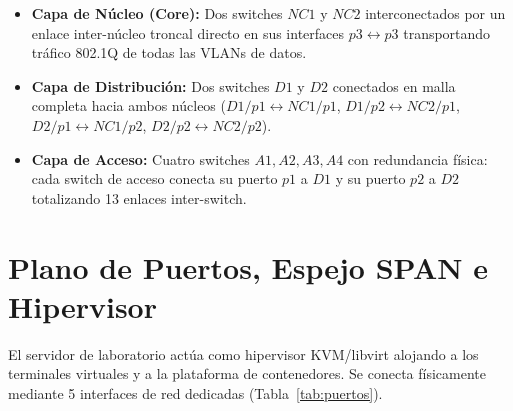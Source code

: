 \documentclass[11pt,a4paper]{report}
\begin{document}
\begin{itemize}[leftmargin=*]
    \item \textbf{Capa de Núcleo (Core):} Dos switches $NC1$ y $NC2$ interconectados por un enlace inter-núcleo troncal directo en sus interfaces $p3 \leftrightarrow p3$ transportando tráfico 802.1Q de todas las VLANs de datos.
    \item \textbf{Capa de Distribución:} Dos switches $D1$ y $D2$ conectados en malla completa hacia ambos núcleos ($D1/p1 \leftrightarrow NC1/p1$, $D1/p2 \leftrightarrow NC2/p1$, $D2/p1 \leftrightarrow NC1/p2$, $D2/p2 \leftrightarrow NC2/p2$).
    \item \textbf{Capa de Acceso:} Cuatro switches $A1, A2, A3, A4$ con redundancia física: cada switch de acceso conecta su puerto $p1$ a $D1$ y su puerto $p2$ a $D2$ totalizando 13 enlaces inter-switch.
\end{itemize}

\section{Plano de Puertos, Espejo SPAN e Hipervisor}
El servidor de laboratorio actúa como hipervisor KVM/libvirt alojando a los terminales virtuales y a la plataforma de contenedores. Se conecta físicamente mediante 5 interfaces de red dedicadas (Tabla~\ref{tab:puertos}).
\end{document}
